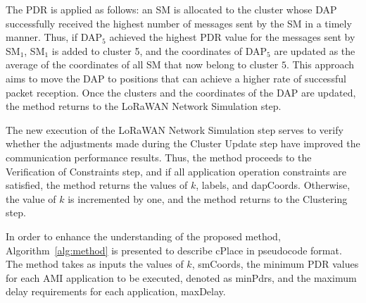 \documentclass[a4paper,fleqn]{cas-dc}
\begin{document}
The \gls{PDR} is applied as follows: an SM is allocated to the cluster whose DAP successfully received the highest number of messages sent by the SM in a timely manner. Thus, if DAP$_{5}$ achieved the highest \gls{PDR} value for the messages sent by SM$_{1}$, SM$_{1}$ is added to cluster 5, and the coordinates of DAP$_{5}$ are updated as the average of the coordinates of all SM that now belong to cluster $5$. This approach aims to move the DAP to positions that can achieve a higher rate of successful packet reception. Once the clusters and the coordinates of the DAP are updated, the method returns to the \gls{LoRaWAN} Network Simulation step.

The new execution of the \gls{LoRaWAN} Network Simulation step serves to verify whether the adjustments made during the Cluster Update step have improved the communication performance results. Thus, the method proceeds to the Verification of Constraints step, and if all application operation constraints are satisfied, the method returns the values of \( k \), labels, and dapCoords. Otherwise, the value of \( k \) is incremented by one, and the method returns to the Clustering step.

In order to enhance the understanding of the proposed method, Algorithm~\ref{alg:method} is presented to describe cPlace in pseudocode format. The method takes as inputs the values of \( k \), smCoords, the minimum \gls{PDR} values for each \gls{AMI} application to be executed, denoted as minPdrs, and the maximum delay requirements for each application, maxDelay.
\end{document}
